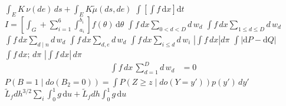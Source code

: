 \documentclass{article}
\begin{document}
$\int_E K\,\nu(de)\,ds+\int_E K\tilde\mu(ds,de)$ $\int\left[\int f\,\mathrm{d}x\right]\mathrm{d}t$ $I=\left[\int_G+\sum_{i=1}^6\int_{a_i}^{b_i}\right]f(\theta)\,\mathrm{d}\theta$
$\int f\,dx\sum_{0<d<D} d\,w_d$ $\int f\,dx\sum_{1\le d\le D} d\,w_d$ $\int f\,dx\sum_{d\mid n} d\,w_d$ $\int f\,dx\sum_{d,e} d\,w_d$
$\int f\,dx\sum_{i\le d} d\,w_i$ $\left|\int f\,dx\right|d\pi$ $\int\left|\mathrm{d}P-\mathrm{d}Q\right|$ $\int f\,dx;\,d\pi$ $|\int f\,dx|\,d\pi$
\[\begin{split}\int f\,dx\,\sum_{d=1}^{D} d\,w_d &= 0\end{split}\]
$P(B=1\mid do(B_2=0))=\int P(Z\geq z\mid do(Y=y'))p(y')\,dy'$ $\tilde L_f dh^{3/2}\sum_i\int_0^1 g\,\mathrm{d}u+\tilde L_f dh\int_0^1 g\,\mathrm{d}u$
\end{document}
